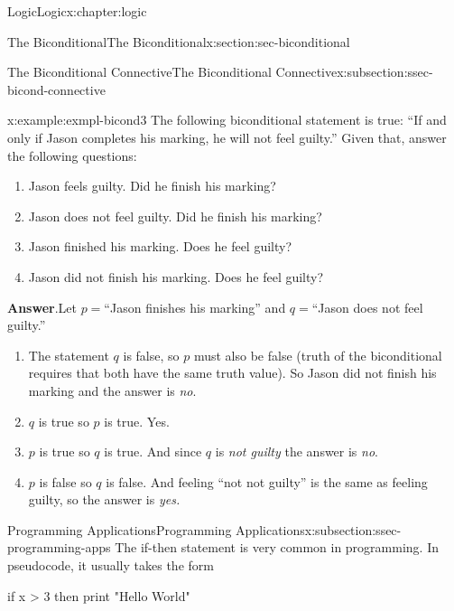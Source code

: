 \documentclass[twoside,10pt,]{book}
\newcommand{\blocktitlefont}{\relax}
\numberwithin{equation}{section}
\begin{document}
\begin{chapterptx}{Logic}{}{Logic}{}{}{x:chapter:logic}
\begin{sectionptx}{The Biconditional}{}{The Biconditional}{}{}{x:section:sec-biconditional}
\begin{subsectionptx}{The Biconditional Connective}{}{The Biconditional Connective}{}{}{x:subsection:ssec-bicond-connective}
 \begin{example}{}{x:example:exmpl-bicond3}%
The following biconditional statement is true: ``If and only if Jason completes his marking, he will not feel guilty.''  Given that, answer the following questions: %
\begin{enumerate}
\item{}Jason feels guilty.  Did he finish his marking?%
\item{}Jason does not feel guilty.  Did he finish his marking?%
\item{}Jason finished his marking.  Does he feel guilty?%
\item{}Jason did not finish his marking.  Does he feel guilty?%
\end{enumerate}
\par\smallskip%
\noindent\textbf{\blocktitlefont Answer}.\label{g:answer:idp29265240}{}\hypertarget{g:answer:idp29265240}{}\quad{}Let \(p=\)``Jason finishes his marking'' and \(q=\)``Jason does not feel guilty.''%
\begin{enumerate}
\item{}The statement \(q\) is false, so \(p\) must also be false (truth of the biconditional requires that both have the same truth value). So Jason did not finish his marking and the answer is \emph{no}.%
\item{}\(q\) is true so \(p\) is true.  Yes.%
\item{}\(p\) is true so \(q\) is true.  And since \(q\) is \emph{not guilty} the answer is \emph{no}.%
\item{}\(p\) is false so \(q\) is false. And feeling ``not not guilty'' is the same as feeling guilty, so the answer is \emph{yes.}%
\end{enumerate}
\end{example}
%
\end{subsectionptx}
%
%
\typeout{************************************************}
\typeout{************************************************}
%
\begin{subsectionptx}{Programming Applications}{}{Programming Applications}{}{}{x:subsection:ssec-programming-apps}
The if-then statement is very common in programming.  In pseudocode, it usually takes the form%
\begin{codedisplay}

              if x > 3 then print "Hello World"
            

\end{codedisplay}
\end{subsectionptx}
\end{sectionptx}
\end{chapterptx}
\end{document}
